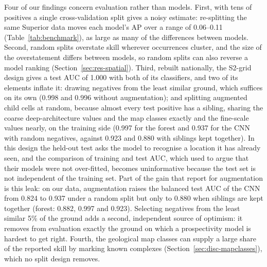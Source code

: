\documentclass[pdflatex,sn-apa]{sn-jnl}
\begin{document}
Four of our findings concern evaluation rather than models. First, with tens of positives a single cross-validation split gives a noisy estimate: re-splitting the same Superior data moves each model's AP over a range of 0.06--0.11 (Table~\ref{tab:benchmark}), as large as many of the differences between models. Second, random splits overstate skill wherever occurrences cluster, and the size of the overstatement differs between models, so random splits can also reverse a model ranking (Section~\ref{sec:res-spatial}). Third, rebuilt nationally, the S2-grid design gives a test AUC of 1.000 with both of its classifiers, and two of its elements inflate it: drawing negatives from the least similar ground, which suffices on its own (0.998 and 0.996 without augmentation); and splitting augmented child cells at random, because almost every test positive has a sibling, sharing the coarse deep-architecture values and the map classes exactly and the fine-scale values nearly, on the training side (0.997 for the forest and 0.937 for the CNN with random negatives, against 0.923 and 0.880 with siblings kept together). In this design the held-out test asks the model to recognise a location it has already seen, and the comparison of training and test AUC, which \citet{Parsa2024} used to argue that their models were not over-fitted, becomes uninformative because the test set is not independent of the training set. Part of the gain that \citet{Parsa2024} report for augmentation is this leak: on our data, augmentation raises the balanced test AUC of the CNN from 0.824 to 0.937 under a random split but only to 0.880 when siblings are kept together (forest: 0.882, 0.997 and 0.923). Selecting negatives from the least similar 5\% of the ground adds a second, independent source of optimism: it removes from evaluation exactly the ground on which a prospectivity model is hardest to get right. Fourth, the geological map classes can supply a large share of the reported skill by marking known complexes (Section~\ref{sec:disc-mapclasses}), which no split design removes.
\end{document}

